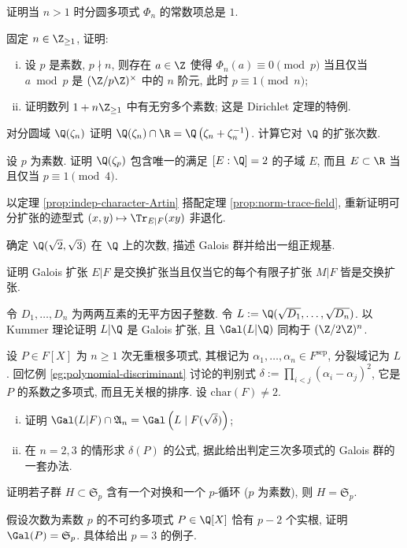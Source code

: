 \begin{Exercises}
	\item 证明当 $n > 1$ 时分圆多项式 $\Phi_n$ 的常数项总是 $1$.
	\item 固定 $n \in \Z_{\geq 1}$, 证明:
		\begin{enumerate}[(i)]
			\item 设 $p$ 是素数, $p \nmid n$, 则存在 $a \in \Z$ 使得 $\Phi_n(a) \equiv 0 \pmod p$ 当且仅当 $a \bmod p$ 是 $(\Z/p\Z)^\times$ 中的 $n$ 阶元, 此时 $p \equiv 1 \pmod n$;
			\item 证明数列 $1 + n\Z_{\geq 1}$ 中有无穷多个素数; 这是 Dirichlet 定理的特例.
		\end{enumerate}
	\item 对分圆域 $\Q(\zeta_n)$ 证明 $\Q(\zeta_n) \cap \R = \Q\left( \zeta_n + \zeta_n^{-1} \right)$. 计算它对 $\Q$ 的扩张次数.
	\item 设 $p$ 为素数. 证明 $\Q(\zeta_p)$ 包含唯一的满足 $[E:\Q]=2$ 的子域 $E$, 而且 $E \subset \R$ 当且仅当 $p \equiv 1 \pmod{4}$.
	\item 以定理 \ref{prop:indep-character-Artin} 搭配定理 \ref{prop:norm-trace-field}, 重新证明可分扩张的迹型式 $(x,y) \mapsto \Tr_{E|F}(xy)$ 非退化.
	\item 确定 $\Q(\sqrt{2},\sqrt{3})$ 在 $\Q$ 上的次数, 描述 Galois 群并给出一组正规基.
	\item 证明 Galois 扩张 $E|F$ 是交换扩张当且仅当它的每个有限子扩张 $M|F$ 皆是交换扩张.
	\item 令 $D_1, \ldots, D_n$ 为两两互素的无平方因子整数. 令 $L := \Q(\sqrt{D_1}, \ldots, \sqrt{D_n})$. 以 Kummer 理论证明 $L|\Q$ 是 Galois 扩张, 且 $\Gal(L|\Q)$ 同构于 $(\Z/2\Z)^n$.
	\item 设 $P \in F[X]$ 为 $n \geq 1$ 次无重根多项式, 其根记为 $\alpha_1, \ldots, \alpha_n \in F^\text{sep}$, 分裂域记为 $L$. 回忆例 \ref{eg:polynomial-discriminant} 讨论的判别式 $\delta := \prod_{i < j} (\alpha_i - \alpha_j)^2$, 它是 $P$ 的系数之多项式, 而且无关根的排序. 设 $\mathrm{char}(F) \neq 2$.
		\begin{enumerate}[(i)]
			\item 证明 $\Gal(L|F) \cap \mathfrak{A}_n = \Gal\left( L \;|\; F(\sqrt{\delta}) \right)$;
			\item 在 $n=2, 3$ 的情形求 $\delta(P)$ 的公式, 据此给出判定三次多项式的 Galois 群的一套办法.
		\end{enumerate}
	\item 证明若子群 $H \subset \mathfrak{S}_p$ 含有一个对换和一个 $p$-循环 ($p$ 为素数), 则 $H = \mathfrak{S}_p$.
	\item 假设次数为素数 $p$ 的不可约多项式 $P \in \Q[X]$ 恰有 $p-2$ 个实根, 证明 $\Gal(P) = \mathfrak{S}_p$. 具体给出 $p=3$ 的例子.

\end{Exercises}
